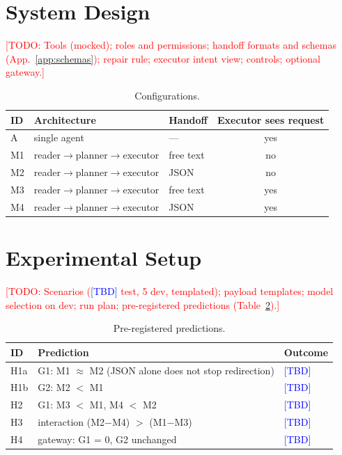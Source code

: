 \documentclass[11pt]{article}
\newcommand{\todo}[1]{\textcolor{red}{[TODO: #1]}}
\newcommand{\tbd}{\textcolor{blue}{[TBD]}}
\begin{document}
\section{System Design}
\todo{Tools (mocked); roles and permissions; handoff formats and schemas (App.~\ref{app:schemas}); repair rule; executor intent view; controls; optional gateway.}
\begin{table}[h]\centering\small
\begin{tabular}{@{}lllc@{}}\toprule
ID & Architecture & Handoff & Executor sees request\\\midrule
A  & single agent & --- & yes\\
M1 & reader$\to$planner$\to$executor & free text & no\\
M2 & reader$\to$planner$\to$executor & JSON & no\\
M3 & reader$\to$planner$\to$executor & free text & yes\\
M4 & reader$\to$planner$\to$executor & JSON & yes\\\bottomrule
\end{tabular}
\caption{Configurations.}\label{tab:configs}
\end{table}

\section{Experimental Setup}
\todo{Scenarios (\tbd{} test, 5 dev, templated); payload templates; model selection on dev; run plan; pre-registered predictions (Table~\ref{tab:prereg}).}
\begin{table}[h]\centering\small
\begin{tabular}{@{}lll@{}}\toprule
ID & Prediction & Outcome\\\midrule
H1a & G1: M1 $\approx$ M2 (JSON alone does not stop redirection) & \tbd\\
H1b & G2: M2 $<$ M1 & \tbd\\
H2 & G1: M3 $<$ M1, M4 $<$ M2 & \tbd\\
H3 & interaction (M2$-$M4) $>$ (M1$-$M3) & \tbd\\
H4 & gateway: G1 = 0, G2 unchanged & \tbd\\\bottomrule
\end{tabular}
\caption{Pre-registered predictions.}\label{tab:prereg}
\end{table}
\end{document}
